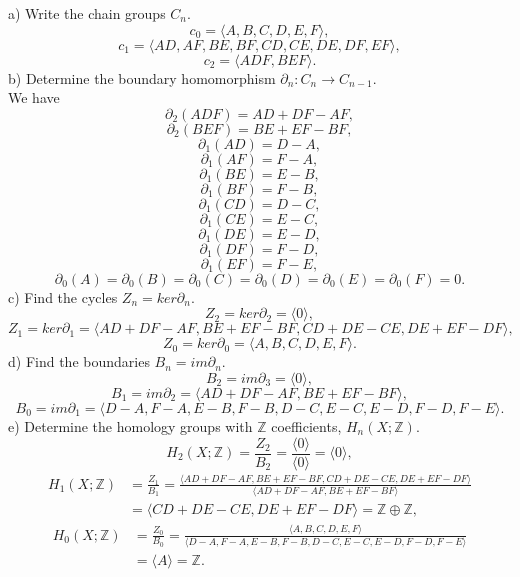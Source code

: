 \documentclass[a4paper,11pt]{article}
\begin{document}
\noindent
a) Write the chain groups $C_n$.
\\
$$ 
c_0 = \langle A, B, C, D, E, F \rangle,
$$
$$
c_1 = \langle AD, AF, BE, BF, CD, CE, DE, DF, EF \rangle,
$$
$$
c_2 = \langle ADF, BEF \rangle.
$$
b) Determine the boundary homomorphism $\partial_n : C_n \rightarrow C_{n - 1}$.
\\
We have
$$
\partial_2(ADF) = AD + DF - AF,
$$
$$
\partial_2(BEF) = BE + EF - BF,
$$
$$
\partial_1(AD) = D - A,
$$
$$
\partial_1(AF) = F - A,
$$
$$
\partial_1(BE) = E - B,
$$
$$
\partial_1(BF) = F - B,
$$
$$
\partial_1(CD) = D - C,
$$
$$
\partial_1(CE) = E - C,
$$
$$
\partial_1(DE) = E - D,
$$
$$
\partial_1(DF) = F - D,
$$
$$
\partial_1(EF) = F - E,
$$
$$
\partial_0(A) = \partial_0(B) = \partial_0(C) = \partial_0(D) = \partial_0(E) = \partial_0(F) = 0.
$$
c) Find the cycles $Z_n = ker \partial_n.$
$$
Z_2 = ker \partial_2 = \langle 0 \rangle,
$$
$$
Z_1 = ker \partial_1 = \langle AD + DF - AF, BE + EF - BF, CD + DE - CE, DE + EF - DF \rangle,
$$
$$
Z_0 = ker \partial_0 = \langle A, B, C, D, E, F \rangle.
$$
d) Find the boundaries $B_n = im \partial_n$.
$$
B_2 = im \partial_3 = \langle 0 \rangle,
$$
$$
B_1 = im \partial_2 = \langle AD + DF - AF, BE + EF - BF \rangle,
$$
$$
B_0 = im \partial_1 = \langle D - A, F - A, E - B, F - B, D - C, E - C, E - D, F - D, F - E \rangle.
$$
e) Determine the homology groups with $\mathbb{Z}$ coefficients, $H_n(X;\mathbb{Z})$.
$$
H_2(X;\mathbb{Z}) = \frac{Z_2}{B_2} = \frac{\langle 0 \rangle}{\langle 0 \rangle} = \langle 0 \rangle,
$$
\begin{align*}
H_1(X;\mathbb{Z}) &= \frac{Z_1}{B_1} = \frac{\langle AD + DF - AF, BE + EF - BF, CD + DE - CE, DE + EF - DF \rangle}{\langle AD + DF - AF, BE + EF - BF \rangle} 
\\
&= \langle CD + DE - CE, DE + EF - DF \rangle = \mathbb{Z} \oplus \mathbb{Z},
\end{align*}
\begin{align*}
H_0(X;\mathbb{Z}) &= \frac{Z_0}{B_0} = \frac{\langle A, B, C, D, E, F \rangle}{\langle D - A, F - A, E - B, F - B, D - C, E - C, E - D, F - D, F - E \rangle} 
\\
&= \langle A \rangle = \mathbb{Z}.
\end{align*}
\end{document}
